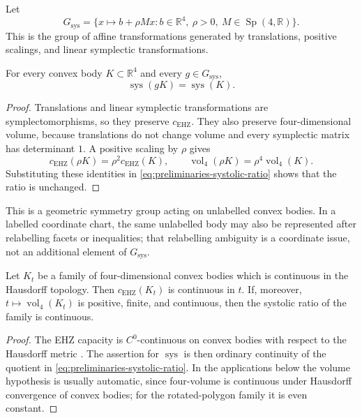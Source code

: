 \begin{definition}
\label{def:preliminaries-systolic-ratio-symmetries}
Let
\[
  G_{\operatorname{sys}}
  =
  \{x\mapsto b+\rho Mx:
    b\in\mathbb R^4,\ \rho>0,\ M\in\operatorname{Sp}(4,\mathbb R)\}.
\]
This is the group of affine transformations generated by translations,
positive scalings, and linear symplectic transformations.
\end{definition}

\begin{lemma}
\label{lem:preliminaries-systolic-ratio-invariance}
For every convex body \(K\subset\mathbb R^4\) and every
\(g\in G_{\operatorname{sys}}\),
\[
  \operatorname{sys}(gK)=\operatorname{sys}(K).
\]
\end{lemma}

\begin{proof}
Translations and linear symplectic transformations are symplectomorphisms, so
they preserve \(c_{\mathrm{EHZ}}\). They also preserve four-dimensional
volume, because translations do not change volume and every symplectic matrix
has determinant \(1\). A positive scaling by \(\rho\) gives
\[
  c_{\mathrm{EHZ}}(\rho K)=\rho^2c_{\mathrm{EHZ}}(K),
  \qquad
  \operatorname{vol}_4(\rho K)=\rho^4\operatorname{vol}_4(K).
\]
Substituting these identities in
\eqref{eq:preliminaries-systolic-ratio} shows that the ratio is unchanged.
\end{proof}

This is a geometric symmetry group acting on unlabelled convex bodies. In a
labelled coordinate chart, the same unlabelled body may also be represented
after relabelling facets or inequalities; that relabelling ambiguity is a
coordinate issue, not an additional element of \(G_{\operatorname{sys}}\).

\begin{proposition}[Continuity]\label{prop:preliminaries-sys-hausdorff-continuity}
Let \(K_t\) be a family of four-dimensional convex bodies which is continuous
in the Hausdorff topology. Then \(c_{\mathrm{EHZ}}(K_t)\) is continuous in
\(t\). If, moreover, \(t\mapsto\operatorname{vol}_4(K_t)\) is positive,
finite, and continuous, then the systolic ratio of the family is continuous.
\end{proposition}

\begin{proof}
The EHZ capacity is \(C^0\)-continuous on convex bodies with respect to the
Hausdorff metric \cite{CH2021}. The assertion for \(\operatorname{sys}\) is
then ordinary continuity of the quotient in
\eqref{eq:preliminaries-systolic-ratio}. In the applications below the volume
hypothesis is usually automatic, since four-volume is continuous under
Hausdorff convergence of convex bodies; for the rotated-polygon family it is
even constant.
\end{proof}
